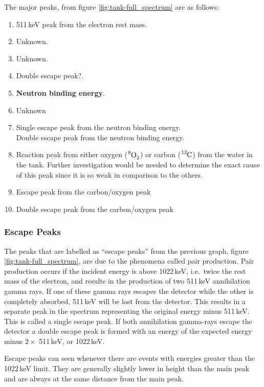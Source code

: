The major peaks, from figure \ref{fig:tank-full_spectrum} are as follows:
	\begin{enumerate}\itemsep1pt \parskip0pt 
		\item 511\,keV peak from the electron rest mass.
		\item Unknown.
		\item Unknown.
		\item Double escape peak?.
		\item \textbf{Neutron binding energy}.
		\item Unknown
		\item Single escape peak from the neutron binding energy.\\
		Double escape peak from the neutron binding energy.
		\item Reaction peak from either oxygen ($\ce{^8O_2}$) or carbon ($\ce{^{12}C}$) from the water in the tank. Further investigation would be needed to determine the exact cause of this peak since it is so weak in comparison to the others.
		\item Escape peak from the carbon/oxygen peak
		\item Double escape peak from the carbon/oxygen peak
	\end{enumerate}

\subsubsection{Escape Peaks} %
\label{ssub:escape_peaks}
The peaks that are labelled as ``escape peaks'' from the previous graph, figure \ref{fig:tank-full_spectrum}, are due to the phenomena called pair production. Pair production occurs if the incident energy is above 1022\,keV, i.e.\ twice the rest mass of the electron, and results in the production of two 511\,keV annihilation gamma rays. If one of these gamma rays escapes the detector while the other is completely absorbed, 511\,keV will be lost from the detector. This results in a separate peak in the spectrum representing the original energy minus 511\,keV. This is called a single escape peak. If both annihilation gamma-rays escape the detector a double escape peak is formed with an energy of the expected energy minus $2\times$ 511\,keV, or 1022\,keV.

Escape peaks can seen whenever there are events with energies greater than the 1022\,keV limit. They are generally slightly lower in height than the main peak and are always at the same distance from the main peak.


